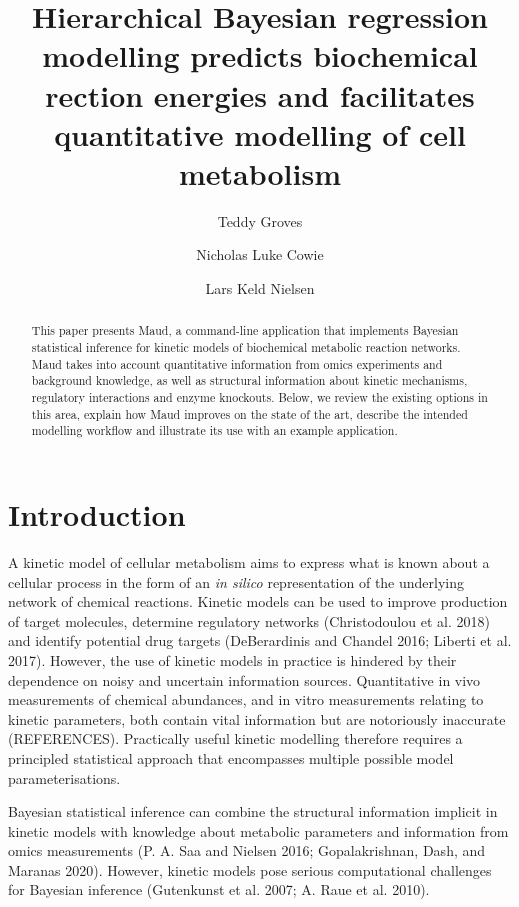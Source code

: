 \documentclass[
  letterpaper,
  DIV=11,
  numbers=noendperiod]{scrartcl}
\title{Hierarchical Bayesian regression modelling predicts biochemical
rection energies and facilitates quantitative modelling of cell
metabolism}
\author{Teddy Groves \and Nicholas Luke Cowie \and Lars Keld Nielsen}
\date{}
\renewcommand*\contentsname{Table of contents}
\newcommand\contentsname{Table of contents}
\begin{document}
\maketitle
\begin{abstract}
This paper presents Maud, a command-line application that implements
Bayesian statistical inference for kinetic models of biochemical
metabolic reaction networks. Maud takes into account quantitative
information from omics experiments and background knowledge, as well as
structural information about kinetic mechanisms, regulatory interactions
and enzyme knockouts. Below, we review the existing options in this
area, explain how Maud improves on the state of the art, describe the
intended modelling workflow and illustrate its use with an example
application.
\end{abstract}
\ifdefined\Shaded\renewenvironment{Shaded}{\begin{tcolorbox}[enhanced, breakable, sharp corners, interior hidden, borderline west={3pt}{0pt}{shadecolor}, boxrule=0pt, frame hidden]}{\end{tcolorbox}}\fi

\renewcommand*\contentsname{Table of contents}
{
\hypersetup{linkcolor=}
\setcounter{tocdepth}{3}
\tableofcontents
}
\hypertarget{introduction}{%
\section{Introduction}\label{introduction}}

A kinetic model of cellular metabolism aims to express what is known
about a cellular process in the form of an \emph{in silico}
representation of the underlying network of chemical reactions. Kinetic
models can be used to improve production of target molecules, determine
regulatory networks (Christodoulou et al. 2018) and identify potential
drug targets (DeBerardinis and Chandel 2016; Liberti et al. 2017).
However, the use of kinetic models in practice is hindered by their
dependence on noisy and uncertain information sources. Quantitative in
vivo measurements of chemical abundances, and in vitro measurements
relating to kinetic parameters, both contain vital information but are
notoriously inaccurate (REFERENCES). Practically useful kinetic
modelling therefore requires a principled statistical approach that
encompasses multiple possible model parameterisations.

Bayesian statistical inference can combine the structural information
implicit in kinetic models with knowledge about metabolic parameters and
information from omics measurements (P. A. Saa and Nielsen 2016;
Gopalakrishnan, Dash, and Maranas 2020). However, kinetic models pose
serious computational challenges for Bayesian inference (Gutenkunst et
al. 2007; A. Raue et al. 2010).
\end{document}

